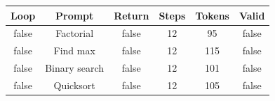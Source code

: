 \begin{table}[h]
\centering
\begin{tabular}{ |c|c|c|c|c|c| }
\hline
Loop & Prompt & Return & Steps & Tokens & Valid \\
\hline
false & Factorial & false & 12 & 95 & false \\
\hline
false & Find max & false & 12 & 115 & false \\
\hline
false & Binary search & false & 12 & 101 & false \\
\hline
false & Quicksort & false & 12 & 105 & false \\
\hline
\end{tabular}
\end{table}
